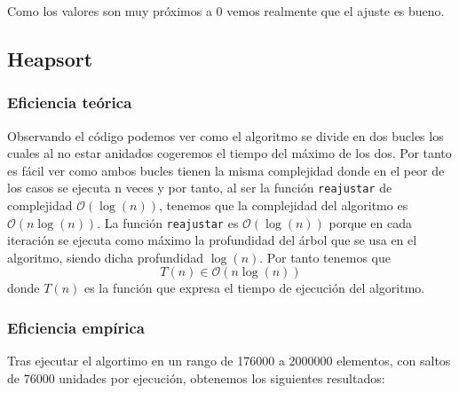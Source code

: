 \documentclass[10pt,a4paper]{article}
\begin{document}
Como los valores son muy próximos a 0 vemos realmente que el ajuste es bueno.

\subsection{Heapsort}

\subsubsection{Eficiencia teórica}
Observando el código podemos ver como el algoritmo se divide en dos bucles los cuales al no estar anidados cogeremos el tiempo del máximo de los dos. Por tanto es fácil ver como ambos bucles tienen la misma complejidad donde en el peor de los casos se ejecuta n veces y por tanto, al ser la función \texttt{reajustar} de complejidad \(\mathcal{O}(\log(n))\), tenemos que la complejidad del algoritmo es \(\mathcal{O}(n\log(n))\). La función \texttt{reajustar} es \(\mathcal{O}(\log(n))\) porque en cada iteración se ejecuta como máximo la profundidad del árbol que se usa en el algoritmo, siendo dicha profundidad \(\log(n)\). Por tanto tenemos que
\[
T(n) \in \mathcal{O}(n\log(n))
\]
donde \(T(n)\) es la función que expresa el tiempo de ejecución del algoritmo.

\subsubsection{Eficiencia empírica}
Tras ejecutar el algortimo en un rango de 176000 a 2000000 elementos, con saltos de 76000 unidades por ejecución, obtenemos los siguientes resultados:
\end{document}
